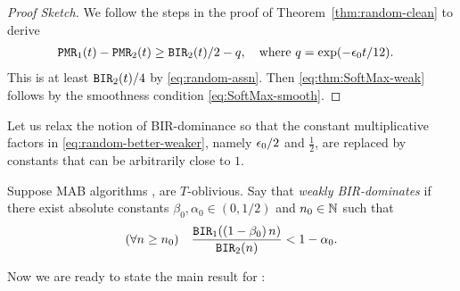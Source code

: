 \begin{proof}[Proof Sketch]
We follow the steps in the proof of Theorem~\ref{thm:random-clean} to derive \begin{align*}
\mathtt{PMR}_1(t) - \mathtt{PMR}_2(t)
    &\geq \mathtt{BIR}_2(t)/2 -q,
    \quad \text{where $q = \exp(-\epsilon_0 t/12)$.}
\end{align*}
This is at least $\mathtt{BIR}_2(t)/4$ by \eqref{eq:random-assn}. Then \eqref{eq:thm:SoftMax-weak} follows by the smoothness condition \eqref{eq:SoftMax-smooth}.
\end{proof}


Let us relax the notion of BIR-dominance so that the constant multiplicative factors in \eqref{eq:random-better-weaker}, namely
 $\epsilon_0/2$ and $\tfrac12$, are replaced by constants that can be arbitrarily close to $1$.

\begin{definition}
Suppose MAB algorithms \alg[1],  \alg[2] are $T$-oblivious. Say that
\alg[1] \emph{weakly BIR-dominates} \alg[2] if there exist absolute  constants $\beta_0, \alpha_0\in (0, 1/2)$ and $n_0\in\mathbb{N}$ such that
 \begin{align}\label{eq:SoftMax-better}
   (\forall n\geq n_0) \quad
   \frac{\mathtt{BIR}_1((1-\beta_0)\, n)}{\mathtt{BIR}_2(n)} <1-\alpha_0.
 \end{align}
 \end{definition}


Now we are ready to state the main result for \SoftMaxRandom:

